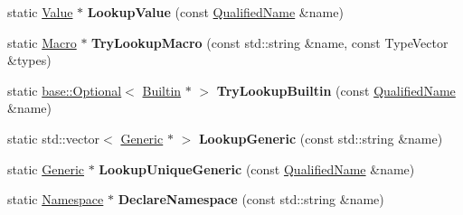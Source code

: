 \begin{DoxyCompactItemize}
\mbox{\label{classv8_1_1internal_1_1torque_1_1Declarations_a022b702386beeed137860b3cc81deb34}} 
static \mbox{\hyperlink{classv8_1_1internal_1_1torque_1_1Value}{Value}} $\ast$ {\bfseries Lookup\+Value} (const \mbox{\hyperlink{structv8_1_1internal_1_1torque_1_1QualifiedName}{Qualified\+Name}} \&name)
\item 
\mbox{\label{classv8_1_1internal_1_1torque_1_1Declarations_a20175603eb0f9a1abb2c7e337f100cfa}} 
static \mbox{\hyperlink{classv8_1_1internal_1_1torque_1_1Macro}{Macro}} $\ast$ {\bfseries Try\+Lookup\+Macro} (const std\+::string \&name, const Type\+Vector \&types)
\item 
\mbox{\label{classv8_1_1internal_1_1torque_1_1Declarations_ac11a6d0d3448daec47217cd33abfd4b7}} 
static \mbox{\hyperlink{classv8_1_1base_1_1Optional}{base\+::\+Optional}}$<$ \mbox{\hyperlink{classv8_1_1internal_1_1torque_1_1Builtin}{Builtin}} $\ast$ $>$ {\bfseries Try\+Lookup\+Builtin} (const \mbox{\hyperlink{structv8_1_1internal_1_1torque_1_1QualifiedName}{Qualified\+Name}} \&name)
\item 
\mbox{\label{classv8_1_1internal_1_1torque_1_1Declarations_a79b81dcc6ae486ec2d99dc9963f19448}} 
static std\+::vector$<$ \mbox{\hyperlink{classv8_1_1internal_1_1torque_1_1Generic}{Generic}} $\ast$ $>$ {\bfseries Lookup\+Generic} (const std\+::string \&name)
\item 
\mbox{\label{classv8_1_1internal_1_1torque_1_1Declarations_ae449e7951db084c7be26a63db91970b6}} 
static \mbox{\hyperlink{classv8_1_1internal_1_1torque_1_1Generic}{Generic}} $\ast$ {\bfseries Lookup\+Unique\+Generic} (const \mbox{\hyperlink{structv8_1_1internal_1_1torque_1_1QualifiedName}{Qualified\+Name}} \&name)
\item 
\mbox{\label{classv8_1_1internal_1_1torque_1_1Declarations_a4d612ebf02815da78632d2cceb2d22db}} 
static \mbox{\hyperlink{classv8_1_1internal_1_1torque_1_1Namespace}{Namespace}} $\ast$ {\bfseries Declare\+Namespace} (const std\+::string \&name)
\item 

\end{DoxyCompactItemize}
